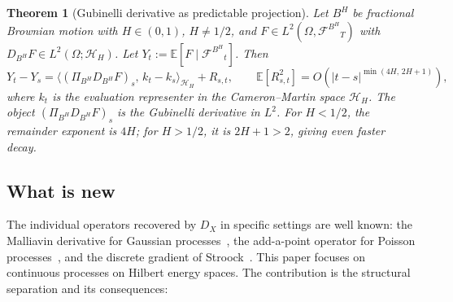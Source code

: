 \documentclass[11pt,a4paper]{article}
\theoremstyle{plain}
\newtheorem{mainthm}{Theorem}
\theoremstyle{definition}
\theoremstyle{remark}
\newcommand{\E}{\mathbb{E}}
\newcommand{\HH}{\mathcal{H}_H}
\newcommand{\BH}{B^H}
\newcommand{\FBH}{\mathcal{F}^{B^H}}
\begin{document}
\begin{mainthm}[Gubinelli derivative as predictable projection]\label{thmF}
Let $\BH$ be fractional Brownian motion with $H \in (0,1)$, $H \neq 1/2$, and $F \in L^2(\Omega,{\FBH}_T)$ with $D_{\BH}F \in L^2(\Omega;\HH)$. Let $Y_t := \E[F\mid{\FBH}_t]$. Then
\[
Y_t - Y_s = \langle(\Pi_{\BH}D_{\BH}F)_s,\, k_t - k_s\rangle_{\HH} + R_{s,t}, \qquad \E[R_{s,t}^2] = O(|t-s|^{\min(4H,\,2H+1)}),
\]
where $k_t$ is the evaluation representer in the Cameron--Martin space $\HH$. The object $(\Pi_{\BH}D_{\BH}F)_s$ is the Gubinelli derivative in $L^2$. For $H < 1/2$, the remainder exponent is $4H$; for $H > 1/2$, it is $2H + 1 > 2$, giving even faster decay.
\end{mainthm}


\subsection{What is new}

The individual operators recovered by $D_X$ in specific settings are well known: the Malliavin derivative for Gaussian processes~\cite{Nualart2006}, the add-a-point operator for Poisson processes~\cite{Privault2009,DiNunno2009}, and the discrete gradient of Stroock~\cite{Stroock1988}. This paper focuses on continuous processes on Hilbert energy spaces. The contribution is the structural separation and its consequences:
\end{document}
